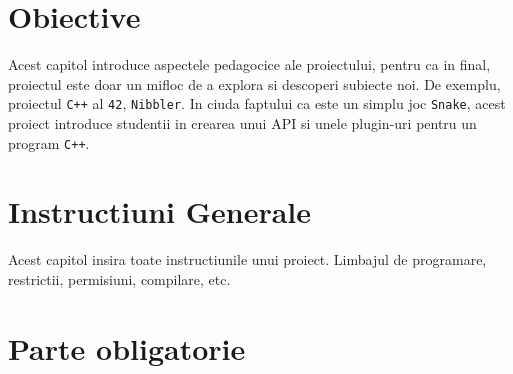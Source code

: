 \documentclass{42-en}
\begin{document}
\chapter{Obiective}

    Acest capitol introduce aspectele pedagocice ale proiectului,
    pentru ca in final, proiectul este doar un mifloc de a explora
    si descoperi subiecte noi. De exemplu, proiectul \texttt{C++} al \texttt{42}, 
    \texttt{Nibbler}. In ciuda faptului ca este un simplu joc 
    \texttt{Snake}, acest proiect introduce studentii in crearea unui API
    si unele plugin-uri pentru un program \texttt{C++}.



\chapter{Instructiuni Generale}

    Acest capitol insira toate instructiunile unui proiect.
    Limbajul de programare, restrictii, permisiuni, compilare, etc.



\chapter{Parte obligatorie}
\end{document}
